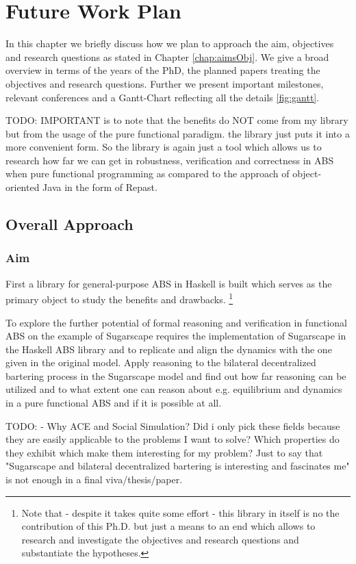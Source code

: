 \chapter{Future Work Plan}
\label{chap:future}

In this chapter we briefly discuss how we plan to approach the aim, objectives and research questions as stated in Chapter \ref{chap:aimsObj}. We give a broad overview in terms of the years of the PhD, the planned papers treating the objectives and research questions. Further we present important milestones, relevant conferences and a Gantt-Chart reflecting all the details \ref{fig:gantt}.

TODO: IMPORTANT is to note that the benefits do NOT come from my library but from the usage of the pure functional paradigm. the library just puts it into a more convenient form. So the library is again just a tool which allows us to research how far we can get in robustness, verification and correctness in ABS when pure functional programming as compared to the approach of object-oriented Java in the form of Repast.

\section{Overall Approach}

\subsection{Aim}
First a library for general-purpose ABS in Haskell is built which serves as the primary object to study the benefits and drawbacks. \footnote{Note that - despite it takes quite some effort - this library in itself is no the contribution of this Ph.D. but just a means to an end which allows to research and investigate the objectives and research questions and substantiate the hypotheses.}

To explore the further potential of formal reasoning and verification in functional ABS on the example of Sugarscape requires the implementation of Sugarscape in the Haskell ABS library and to replicate and align the dynamics with the one given in the original model. Apply reasoning to the bilateral decentralized bartering process in the Sugarscape model and find out how far reasoning can be utilized and to what extent one can reason about e.g. equilibrium and dynamics in a pure functional ABS and if it is possible at all.

TODO:
- Why ACE and Social Simulation? Did i only pick these fields because they are easily applicable to the problems I want to solve? Which properties do they exhibit which make them interesting for my problem? Just to say that "Sugarscape and bilateral decentralized bartering is interesting and fascinates me" is not enough in a final viva/thesis/paper.	

